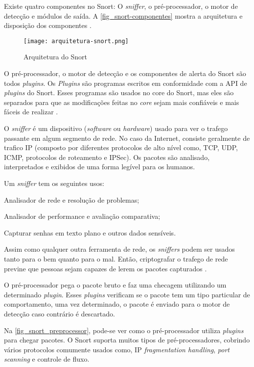 Existe quatro componentes no Snort: O \textit{sniffer}, o pré-processador, o motor de detecção e módulos de saída. A \autoref{fig_snort-componentes} mostra a arquitetura e disposição dos componentes \cite{snort:andrew}.

\begin{figure}[!htb]
  \centering
  \caption{Arquitetura do Snort} \label{fig_snort-componentes}
  \texttt{[image: arquitetura-snort.png]}
\end{figure}

O pré-processador, o motor de detecção e os componentes de alerta do Snort são todos \textit{plugins}. Os \textit{Plugins} são programas escritos em conformidade com a API de \textit{plugins} do Snort. Esses programas são usados no core do Snort, mas eles são separados para que as modificações feitas no \textit{core} sejam mais confiáveis e mais fáceis de realizar \cite{snort:andrew}.

O \textit{sniffer} é um dispositivo (\textit{software} ou \textit{hardware}) usado para ver o trafego passante em algum segmento de rede. No caso da Internet, consiste geralmente de trafico IP (composto por diferentes protocolos de alto nível como, TCP, UDP, ICMP, protocolos de roteamento e IPSec). Os pacotes são analisado, interpretados e exibidos de uma forma legível para os humanos.

Um \textit{sniffer} tem os seguintes usos:

\begin{alineas}
\item Analisador de rede e resolução de problemas;
\item Analisador de performance e avaliação comparativa;
\item Capturar senhas em texto plano e outros dados sensíveis.
\end{alineas}

Assim como qualquer outra ferramenta de rede, os \textit{sniffers} podem ser usados tanto para o bem quanto para o mal. Então, criptografar o trafego de rede previne que pessoas sejam capazes de lerem os pacotes capturados \cite{snort:andrew}.

O pré-processador pega o pacote bruto e faz uma checagem utilizando um determinado \textit{plugin}. Esses \textit{plugins} verificam se o pacote tem um tipo particular de comportamento, uma vez determinado, o pacote é enviado para o motor de detecção caso contrário é descartado.

Na \autoref{fig_snort_preprocessor}, pode-se ver como o pré-processador utiliza \textit{plugins} para chegar pacotes. O Snort suporta muitos tipos de pré-processadores, cobrindo vários protocolos comumente usados como, IP \textit{fragmentation handling}, \textit{port scanning} e controle de fluxo.

